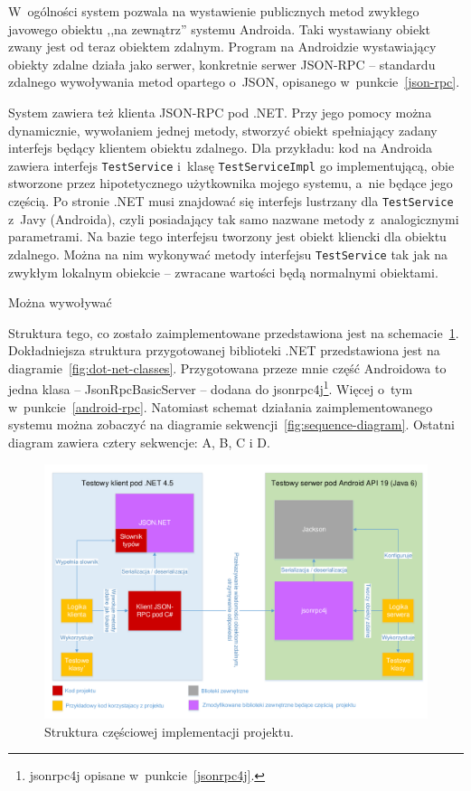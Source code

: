 W~ogólności system pozwala na wystawienie publicznych metod zwykłego javowego obiektu ,,na zewnątrz'' systemu Androida.
Taki wystawiany obiekt zwany jest od teraz obiektem zdalnym.
Program na Androidzie wystawiający obiekty zdalne działa jako serwer, konkretnie serwer JSON-RPC -- standardu zdalnego wywoływania metod opartego o~JSON, opisanego w~punkcie~\ref{json-rpc}.

System zawiera też klienta JSON-RPC pod .NET. Przy jego pomocy można dynamicznie, wywołaniem jednej metody, stworzyć obiekt spełniający zadany interfejs będący klientem obiektu zdalnego.
Dla przykładu: kod na Androida zawiera interfejs \texttt{TestService} i~klasę \texttt{TestServiceImpl} go implementującą, obie stworzone przez hipotetycznego użytkownika mojego systemu, a~nie będące jego częścią.
Po stronie .NET musi znajdować się interfejs lustrzany dla \texttt{TestService} z~Javy (Androida), czyli posiadający tak samo nazwane metody z~analogicznymi parametrami.
Na bazie tego interfejsu tworzony jest obiekt kliencki dla obiektu zdalnego. Można na nim wykonywać metody interfejsu \texttt{TestService} tak jak na zwykłym lokalnym obiekcie -- zwracane wartości będą normalnymi obiektami.

Można wywoływać

Struktura tego, co zostało zaimplementowane przedstawiona jest na schemacie~\ref{fig:implementation-overview}.
Dokładniejsza struktura przygotowanej biblioteki .NET przedstawiona jest na diagramie~\ref{fig:dot-net-classes}.
Przygotowana przeze mnie część Androidowa to jedna klasa -- JsonRpcBasicServer -- dodana do jsonrpc4j\footnote{jsonrpc4j opisane w~punkcie~\ref{jsonrpc4j}.}. Więcej o~tym w~punkcie~\ref{android-rpc}.
Natomiast schemat działania zaimplementowanego systemu można zobaczyć na diagramie sekwencji~\ref{fig:sequence-diagram}.
Ostatni diagram zawiera cztery sekwencje: A, B, C i D.
\begin{figure}
	\centering
		\includegraphics[width=\textwidth]{img/schematy/schemat-implementacji.pdf}
	\caption{Struktura częściowej implementacji projektu.}
	\label{fig:implementation-overview}
\end{figure}

